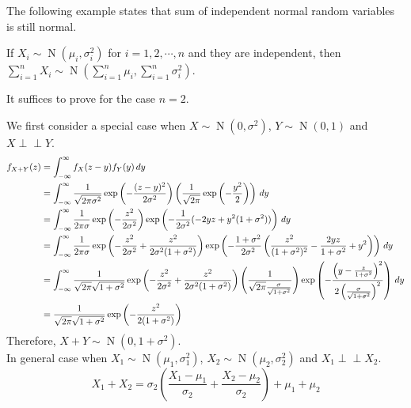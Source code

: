 \documentclass{huhtakm-template-book}
\newcommand{\independent}{\perp\!\!\!\perp}
\DeclareMathOperator{\N}{N}
\begin{document}
    The following example states that sum of independent normal random variables is still normal.
    \begin{eg}
        If $X_{i}\sim\N(\mu_{i},\sigma_{i}^{2})$ for $i=1,2,\cdots,n$ and they are independent, then $\sum_{i=1}^{n}X_{i}\sim\N\left(\sum_{i=1}^{n}\mu_{i},\sum_{i=1}^{n}\sigma_{i}^{2}\right)$.
    \end{eg}
    
    \newpage
    \begin{cla}
        It suffices to prove for the case $n=2$.
    \end{cla}
    \begin{proofing}
        We first consider a special case when $X\sim\N(0,\sigma^{2})$, $Y\sim\N(0,1)$ and $X\independent Y$.
        \begin{align*}
            f_{X+Y}(z)&=\int_{-\infty}^{\infty} f_{X}(z-y)f_{Y}(y)\,dy\\
            &=\int_{-\infty}^{\infty}\frac{1}{\sqrt{2\pi\sigma^{2}}}\exp\left(-\frac{(z-y)^{2}}{2\sigma^{2}}\right)\left(\frac{1}{\sqrt{2\pi}}\exp\left(-\frac{y^{2}}{2}\right)\right)\,dy\\
            &=\int_{-\infty}^{\infty}\frac{1}{2\pi\sigma}\exp\left(-\frac{z^{2}}{2\sigma^{2}}\right)\exp\left(-\frac{1}{2\sigma^{2}}(-2yz+y^{2}(1+\sigma^{2}))\right)\,dy\\
            &=\int_{-\infty}^{\infty}\frac{1}{2\pi\sigma}\exp\left(-\frac{z^{2}}{2\sigma^{2}}+\frac{z^{2}}{2\sigma^{2}(1+\sigma^{2})}\right)\exp\left(-\frac{1+\sigma^{2}}{2\sigma^{2}}\left(\frac{z^{2}}{(1+\sigma^{2})^{2}}-\frac{2yz}{1+\sigma^{2}}+y^{2}\right)\right)\,dy\\
            &=\int_{-\infty}^{\infty}\frac{1}{\sqrt{2\pi}\sqrt{1+\sigma^{2}}}\exp\left(-\frac{z^{2}}{2\sigma^{2}}+\frac{z^{2}}{2\sigma^{2}(1+\sigma^{2})}\right)\left(\frac{1}{\sqrt{2\pi}\frac{\sigma}{\sqrt{1+\sigma^{2}}}}\right)\exp\left(-\frac{\left(y-\frac{z}{1+\sigma^{2}}\right)^{2}}{2\left(\frac{\sigma}{\sqrt{1+\sigma^{2}}}\right)^{2}}\right)\,dy\\
            &=\frac{1}{\sqrt{2\pi}\sqrt{1+\sigma^{2}}}\exp\left(-\frac{z^{2}}{2(1+\sigma^{2})}\right)
        \end{align*}
        Therefore, $X+Y\sim\N(0,1+\sigma^{2})$.\\
        In general case when $X_{1}\sim\N(\mu_{1},\sigma_{1}^{2})$, $X_{2}\sim\N(\mu_{2},\sigma_{2}^{2})$ and $X_{1}\independent X_{2}$.
        \begin{equation*}
            X_{1}+X_{2}=\sigma_{2}\left(\frac{X_{1}-\mu_{1}}{\sigma_{2}}+\frac{X_{2}-\mu_{2}}{\sigma_{2}}\right)+\mu_{1}+\mu_{2}

\end{equation*}
\end{proofing}
\end{document}
